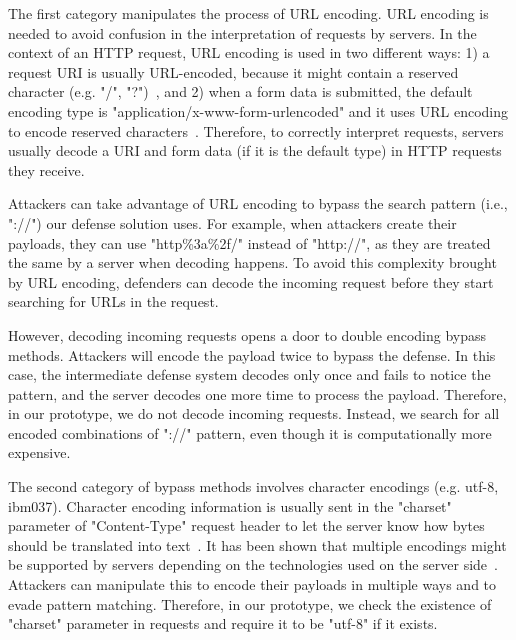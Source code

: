 
The first category manipulates the process of URL encoding. URL encoding is needed to avoid confusion in the interpretation of requests by servers. In the context of an HTTP request, URL encoding is used in two different ways: 1) a request URI is usually URL-encoded, because it might contain a reserved character (e.g. "/", "?")~\cite{uri-rfc}, and 2) when a form data is submitted, the default encoding type is "application/x-www-form-urlencoded" and it uses URL encoding to encode reserved characters~\cite{forms-w3c}. Therefore, to correctly interpret requests, servers usually decode a URI and form data (if it is the default type) in HTTP requests they receive. 

Attackers can take advantage of URL encoding to bypass the search pattern (i.e., "://") our defense solution uses. For example, when attackers create their payloads, they can use "http\%3a\%2f/" instead of "http://", as they are treated the same by a server when decoding happens. To avoid this complexity brought by URL encoding, defenders can decode the incoming request before they start searching for URLs in the request. 

However, decoding incoming requests opens a door to double encoding bypass methods. Attackers will encode the payload twice to bypass the defense. In this case, the intermediate defense system decodes only once and fails to notice the pattern, and the server decodes one more time to process the payload. Therefore, in our prototype, we do not decode incoming requests. Instead, we search for all encoded combinations of "://" pattern, even though it is computationally more expensive. %

The second category of bypass methods involves character encodings (e.g. utf-8, ibm037). Character encoding information is usually sent in the "charset" parameter of "Content-Type" request header to let the server know how bytes should be translated into text~\cite{mdn-charset1, mdn-charset2}. It has been shown that multiple encodings might be supported by servers depending on the technologies used on the server side~\cite{charset-bypass}. Attackers can manipulate this to encode their payloads in multiple ways and to evade pattern matching. Therefore, in our prototype, we check the existence of "charset" parameter in requests and require it to be "utf-8" if it exists. 

